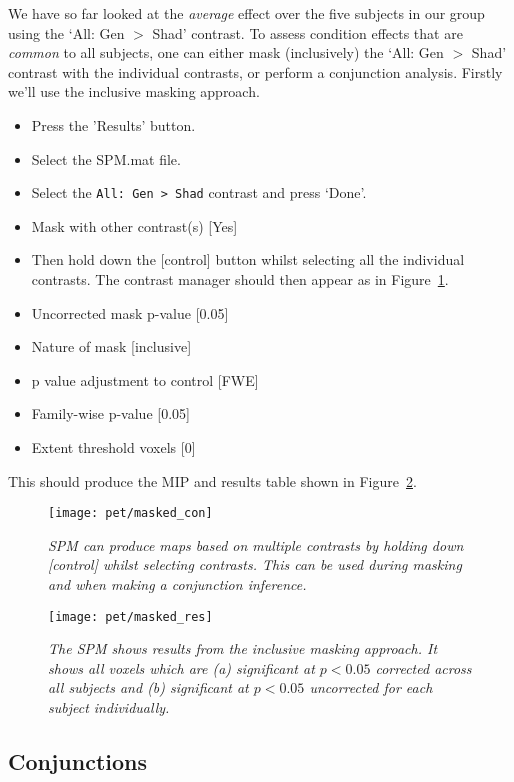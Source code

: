 We have so far looked at the {\em average} effect over the five subjects in our group using the `All: Gen $>$ Shad' contrast.
To assess condition effects that are {\em common} to all subjects, one can either mask (inclusively) the `All: Gen $>$ Shad' contrast with the individual contrasts, or perform a conjunction analysis. Firstly we'll use the inclusive masking
approach.
\begin{itemize}
\item{Press the 'Results' button.}
\item{Select the SPM.mat file.}
\item{Select the \verb!All: Gen > Shad! contrast and press `Done'.}
\item{Mask with other contrast(s) [Yes]}
\item{Then hold down the [control] button whilst selecting all the individual contrasts. The contrast manager should then appear as in Figure~\ref{masked_con}.}
\item{Uncorrected mask p-value [0.05]}
\item{Nature of mask [inclusive]}
\item{p value adjustment to control [FWE]}
\item{Family-wise p-value [0.05]}
\item{Extent threshold {voxels} [0]}
\end{itemize}
This should produce the MIP and results table shown in Figure~\ref{masked_res}.
\begin{figure}
\begin{center}
\texttt{[image: pet/masked\_con]}
\caption{\em SPM can produce maps based on multiple contrasts by holding down [control] whilst selecting contrasts. This can be used during masking and when making a conjunction inference. \label{masked_con}}
\end{center}
\end{figure}
\begin{figure}
\begin{center}
\texttt{[image: pet/masked\_res]}
\caption{\em The SPM shows results from the inclusive masking approach. It shows all voxels which are (a) significant at $p<0.05$ corrected across all subjects and (b) significant at $p<0.05$ uncorrected for each subject individually. \label{masked_res}}
\end{center}
\end{figure}

\subsection{Conjunctions}

